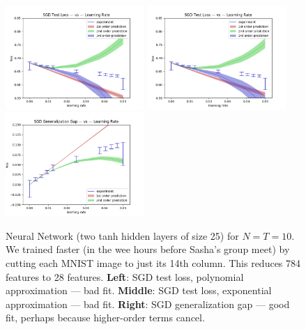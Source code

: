 \documentclass[12pt]{article}
\begin{document}
            \begin{figure}[h]
                \center
                \includegraphics[width=5.25cm]{out-sgd-deep17}
                \includegraphics[width=5.25cm]{out-sgd-deep17-exp}
                \includegraphics[width=5.25cm]{gen-sgd-deep17}
                \caption{
                    Neural Network (two tanh hidden layers of size 25) for $N=T=10$.
                    We trained faster (in the wee hours before Sasha's group meet) by cutting
                    each MNIST image to just its 14th column.  This reduces 784 features to 28 features.  
                    {\bf Left}: SGD test loss, polynomial approximation --- bad fit.
                    {\bf Middle}: SGD test loss, exponential approximation --- bad fit.
                    {\bf Right}: SGD generalization gap --- good fit, perhaps because higher-order terms cancel. 
                    }
            \end{figure}

\end{document}
